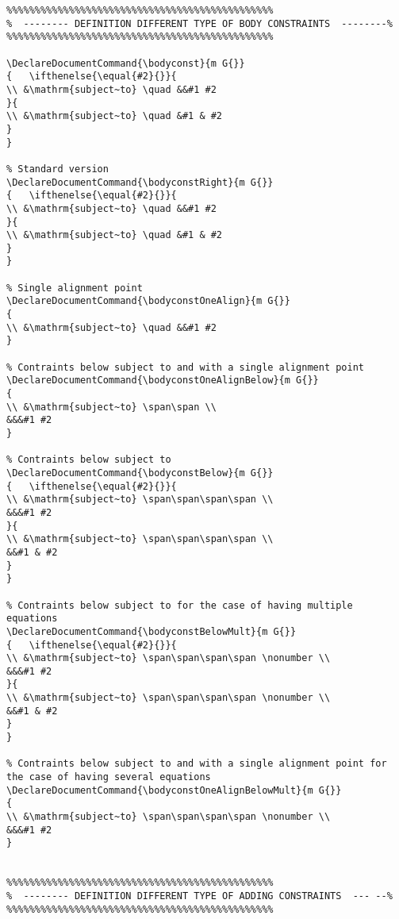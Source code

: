 \documentclass[]{report}
\begin{document}
\begin{verbatim}
%%%%%%%%%%%%%%%%%%%%%%%%%%%%%%%%%%%%%%%%%%%%%%%
%  -------- DEFINITION DIFFERENT TYPE OF BODY CONSTRAINTS  --------%
%%%%%%%%%%%%%%%%%%%%%%%%%%%%%%%%%%%%%%%%%%%%%%%

\DeclareDocumentCommand{\bodyconst}{m G{}}
{	\ifthenelse{\equal{#2}{}}{
\\ &\mathrm{subject~to} \quad &&#1 #2
}{
\\ &\mathrm{subject~to} \quad &#1 & #2
}
}

% Standard version
\DeclareDocumentCommand{\bodyconstRight}{m G{}}
{	\ifthenelse{\equal{#2}{}}{
\\ &\mathrm{subject~to} \quad &&#1 #2
}{
\\ &\mathrm{subject~to} \quad &#1 & #2
}
}

% Single alignment point
\DeclareDocumentCommand{\bodyconstOneAlign}{m G{}}
{
\\ &\mathrm{subject~to} \quad &&#1 #2
}

% Contraints below subject to and with a single alignment point
\DeclareDocumentCommand{\bodyconstOneAlignBelow}{m G{}}
{
\\ &\mathrm{subject~to} \span\span \\
&&&#1 #2		
}

% Contraints below subject to
\DeclareDocumentCommand{\bodyconstBelow}{m G{}}
{	\ifthenelse{\equal{#2}{}}{
\\ &\mathrm{subject~to} \span\span\span\span \\
&&&#1 #2		
}{
\\ &\mathrm{subject~to} \span\span\span\span \\
&&#1 & #2
}
}

% Contraints below subject to for the case of having multiple equations
\DeclareDocumentCommand{\bodyconstBelowMult}{m G{}}
{	\ifthenelse{\equal{#2}{}}{
\\ &\mathrm{subject~to} \span\span\span\span \nonumber \\
&&&#1 #2		
}{
\\ &\mathrm{subject~to} \span\span\span\span \nonumber \\
&&#1 & #2
}
}

% Contraints below subject to and with a single alignment point for the case of having several equations
\DeclareDocumentCommand{\bodyconstOneAlignBelowMult}{m G{}}
{
\\ &\mathrm{subject~to} \span\span\span\span \nonumber \\
&&&#1 #2		
}


%%%%%%%%%%%%%%%%%%%%%%%%%%%%%%%%%%%%%%%%%%%%%%%
%  -------- DEFINITION DIFFERENT TYPE OF ADDING CONSTRAINTS  --- --%
%%%%%%%%%%%%%%%%%%%%%%%%%%%%%%%%%%%%%%%%%%%%%%%


\end{verbatim}
\end{document}
